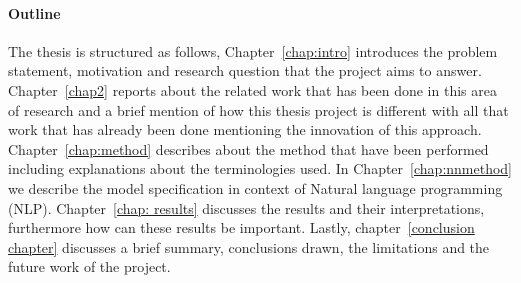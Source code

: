 \paragraph{Outline}
The thesis is structured as follows, Chapter~\ref{chap:intro} introduces the problem statement, motivation and research question that the project aims to answer. Chapter~\ref{chap2} reports about the related work that has been done in this area of research and a brief mention of how this thesis project is different with all that work that has already been done mentioning the innovation of this approach. Chapter~\ref{chap:method} describes about the method that have been performed including explanations about the terminologies used. In Chapter~\ref{chap:nnmethod} we describe the model specification in context of Natural language programming (NLP). Chapter~\ref{chap: results} discusses the results and their interpretations, furthermore how can these results be important. 
Lastly, chapter~\ref{conclusion chapter} discusses a brief summary, conclusions drawn, the limitations and the future work of the project. 